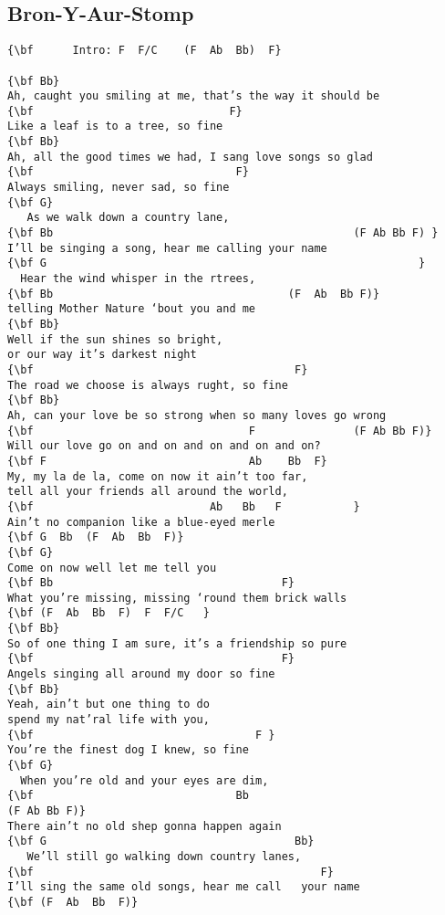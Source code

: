\documentclass[a4paper]{article}
\begin{document}
\subsection{Bron-Y-Aur-Stomp} %
\label{sub:Bron-Y-Aur-Stomp}
\begin{Verbatim}[commandchars=\\\{\}]
{\bf 	  Intro: F  F/C    (F  Ab  Bb)  F}

{\bf Bb}
Ah, caught you smiling at me, that’s the way it should be
{\bf                              F}
Like a leaf is to a tree, so fine
{\bf Bb}
Ah, all the good times we had, I sang love songs so glad
{\bf                               F}
Always smiling, never sad, so fine
{\bf G}
   As we walk down a country lane, 
{\bf Bb                                              (F Ab Bb F) }
I’ll be singing a song, hear me calling your name
{\bf G                                                         }
  Hear the wind whisper in the rtrees, 
{\bf Bb                                    (F  Ab  Bb F)}
telling Mother Nature ‘bout you and me
{\bf Bb}
Well if the sun shines so bright, 
or our way it’s darkest night
{\bf                                        F}
The road we choose is always rught, so fine
{\bf Bb}
Ah, can your love be so strong when so many loves go wrong 
{\bf                                 F               (F Ab Bb F)}
Will our love go on and on and on and on and on?
{\bf F                               Ab    Bb  F}
My, my la de la, come on now it ain’t too far, 
tell all your friends all around the world,
{\bf                           Ab   Bb   F           }
Ain’t no companion like a blue-eyed merle
{\bf G  Bb  (F  Ab  Bb  F)}
{\bf G}
Come on now well let me tell you
{\bf Bb                                   F}
What you’re missing, missing ‘round them brick walls
{\bf (F  Ab  Bb  F)  F  F/C   }
{\bf Bb}
So of one thing I am sure, it’s a friendship so pure
{\bf                                      F}
Angels singing all around my door so fine
{\bf Bb}
Yeah, ain’t but one thing to do 
spend my nat’ral life with you,
{\bf                                  F }
You’re the finest dog I knew, so fine
{\bf G}
  When you’re old and your eyes are dim,
{\bf                               Bb                                        (F Ab Bb F)}
There ain’t no old shep gonna happen again
{\bf G                                      Bb}
   We’ll still go walking down country lanes, 
{\bf                                            F}
I’ll sing the same old songs, hear me call   your name
{\bf (F  Ab  Bb  F)}
\end{Verbatim}
\newpage
\end{document}
